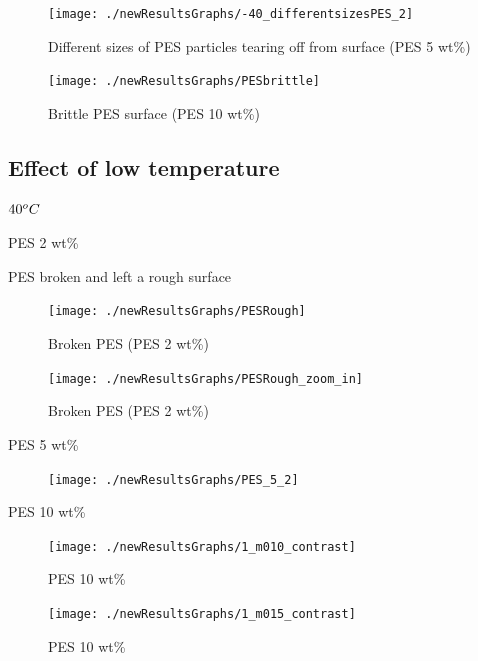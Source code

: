 \documentclass[numbers=noendperiod,chapterprefix=on]{icldt} %
\begin{document}
{\begin{figure}[!hp]
\centering
\texttt{[image: ./newResultsGraphs/-40\_differentsizesPES\_2]}
\caption{Different sizes of PES particles tearing off from surface (PES 5 wt\%)} \label{differentsizesPES_2}
\end{figure}
\FloatBarrier

\begin{figure}[!hp]
\centering
\texttt{[image: ./newResultsGraphs/PESbrittle]}
\caption{Brittle PES surface (PES 10 wt\%)} \label{PESbrittle}
\end{figure}
\FloatBarrier






\subsection{Effect of low temperature}

$\-40 ^oC$

PES 2 wt\%

PES broken and left a rough surface

\begin{figure}[!hp]
\centering
\texttt{[image: ./newResultsGraphs/PESRough]}
\caption{Broken PES (PES 2 wt\%)} \label{PESRough}
\end{figure}
\FloatBarrier

\begin{figure}[!hp]
\centering
\texttt{[image: ./newResultsGraphs/PESRough\_zoom\_in]}
\caption{Broken PES (PES 2 wt\%)} \label{PESRough_zoom_in}
\end{figure}
\FloatBarrier

PES 5 wt\%

\begin{figure}[!hp]
\centering
\texttt{[image: ./newResultsGraphs/PES\_5\_2]}
\caption{} \label{PES_5_2}
\end{figure}
\FloatBarrier

PES 10 wt\%

\begin{figure}[!hp]
\centering
\texttt{[image: ./newResultsGraphs/1\_m010\_contrast]}
\caption{PES 10 wt\%} \label{1_m010_contrast}
\end{figure}
\FloatBarrier

\begin{figure}[!hp]
\centering
\texttt{[image: ./newResultsGraphs/1\_m015\_contrast]}
\caption{PES 10 wt\%} \label{1_m015_contrast}
\end{figure}
\FloatBarrier

}
\end{document}

